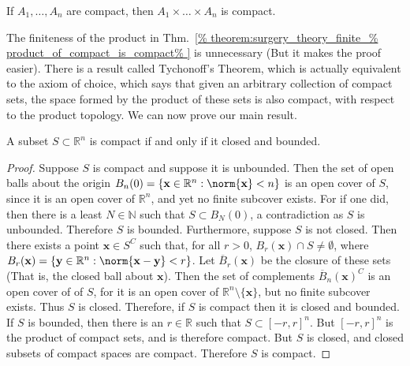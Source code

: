 \documentclass[crop=false,class=book,oneside]{standalone}
\begin{document}
            \begin{theorem}
                \label{%
                    theorem:surgery_theory_finite_%
                    product_of_compact_is_compact%
                }
                If $A_{1},\hdots,A_{n}$ are compact,
                then $A_{1}\times\hdots\times{A_{n}}$ is compact.
            \end{theorem}
            The finiteness of the product in Thm.~\ref{%
                theorem:surgery_theory_finite_%
                product_of_compact_is_compact%
            } is
            unnecessary (But it makes the proof easier). There
            is a result called Tychonoff's Theorem, which is
            actually equivalent to the axiom of choice, which
            says that given an arbitrary collection of compact sets,
            the space formed by the product of these sets is also
            compact, with respect to the product topology.
            We can now prove our main result.
            \begin{theorem}
                \label{theorem:surgery_theory_Heine_Borel}
                A subset $S\subset\mathbb{R}^{n}$ is compact if
                and only if it closed and bounded.
            \end{theorem}
            \begin{proof}
                Suppose $S$ is compact and
                suppose it is unbounded. Then the set of open
                balls about the origin
                $B_{n}(0)=\{\mathbf{x}\in\mathbb{R}^{n}%
                            :\norm{\mathbf{x}}<n\}$
                is an open cover of $S$, since it is an open
                cover of $\mathbb{R}^{n}$, and yet no
                finite subcover exists. For if one did, then there
                is a least $N\in\mathbb{N}$ such that
                $S\subset{B_{N}(0)}$, a contradiction as
                $S$ is unbounded. Therefore $S$ is bounded.
                Furthermore, suppose $S$ is
                not closed. Then there exists a point
                $\mathbf{x}\in{S^{C}}$ such that, for all
                $r>0$, $B_{r}(\mathbf{x})\cap{S}\ne\emptyset$,
                where
                $B_{r}(\mathbf{x})=\{\mathbf{y}\in\mathbb{R}^{n}:%
                 \norm{\mathbf{x}-\mathbf{y}}<r\}$.
                Let $\overline{B}_{r}(\mathbf{x})$ be the
                closure of these sets (That is, the closed ball
                about $\mathbf{x}$). Then the set of complements
                $\overline{B}_{n}(\mathbf{x})^{C}$ is an open
                cover of of $S$, for it is an open cover of
                $\mathbb{R}^{n}\setminus\{\mathbf{x}\}$, but no
                finite subcover exists. Thus $S$ is closed. Therefore,
                if $S$ is compact then it is closed and bounded.
                If $S$ is bounded, then there is an $r\in\mathbb{R}$
                such that $S\subset[-r,r]^{n}$. But
                $[-r,r]^{n}$ is the product of compact sets, and
                is therefore compact. But $S$ is closed, and closed
                subsets of compact spaces are compact. Therefore
                $S$ is compact.
            \end{proof}
\end{document}
